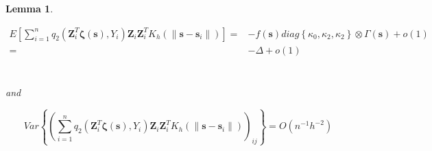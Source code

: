 \documentclass[authoryear,review, 12pt]{elsarticle}
\newtheorem{lem}{Lemma}
\begin{document}
\begin{lem}
\label{lemma:delta}

\begin{align*}
E\left[\sum_{i=1}^{n}q_{2}\left(\bm{Z}_{i}^{T}\bm{\zeta}\left(\bm{s}\right),Y_{i}\right)\bm{Z}_{i}\bm{Z}_{i}^{T}K_{h}\left(\|\bm{s}-\bm{s}_{i}\|\right)\right]= & -f\left(\bm{s}\right)diag\left\{ \kappa_{0},\kappa_{2},\kappa_{2}\right\} \otimes\Gamma\left(\bm{s}\right)+o\left(1\right)\\
= & -\Delta+o\left(1\right)
\end{align*}


\begin{multline*}
\\
\end{multline*}


and

\[
Var\left\{ \left(\sum_{i=1}^{n}q_{2}\left(\bm{Z}_{i}^{T}\bm{\zeta}\left(\bm{s}\right),Y_{i}\right)\bm{Z}_{i}\bm{Z}_{i}^{T}K_{h}\left(\|\bm{s}-\bm{s}_{i}\|\right)\right)_{ij}\right\} =O\left(n^{-1}h^{-2}\right)
\]

\end{lem}
\end{document}
